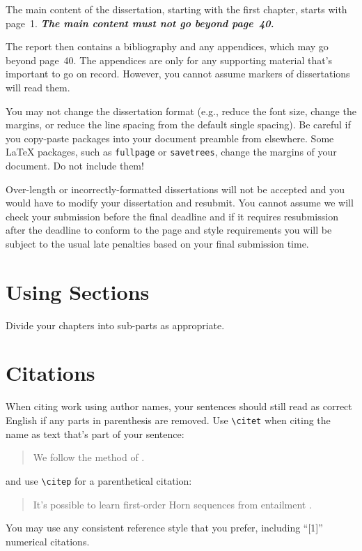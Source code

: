 \documentclass[logo,bsc,singlespacing,parskip,online]{infthesis}
\begin{document}
The main content of the dissertation, starting with the first chapter,
starts with page~1. \emph{\textbf{The main content must not go beyond page~40.}}

The report then contains a bibliography and any appendices, which may go beyond
page~40. The appendices are only for any supporting material that's important to
go on record. However, you cannot assume markers of dissertations will read them.

You may not change the dissertation format (e.g., reduce the font size, change
the margins, or reduce the line spacing from the default single spacing). Be
careful if you copy-paste packages into your document preamble from elsewhere.
Some \LaTeX{} packages, such as \texttt{fullpage} or \texttt{savetrees}, change
the margins of your document. Do not include them!

Over-length or incorrectly-formatted dissertations will not be accepted and you
would have to modify your dissertation and resubmit. You cannot assume we will
check your submission before the final deadline and if it requires resubmission
after the deadline to conform to the page and style requirements you will be
subject to the usual late penalties based on your final submission time.

\section{Using Sections}

Divide your chapters into sub-parts as appropriate.

\section{Citations}

When citing work using author names, your sentences should still read
as correct English if any parts in parenthesis are removed.
Use {\tt {\textbackslash}citet} when citing the name as text that's part of your sentence: 
\begin{quote}
  We follow the method of \citet{P1}.
\end{quote}
and use {\tt {\textbackslash}citep} for a parenthetical citation:
\begin{quote}
  It's possible to learn first-order Horn sequences from entailment \citep{P2}.
\end{quote}

You may use any consistent reference style that you prefer, including ``[1]'' numerical citations. 
\end{document}
